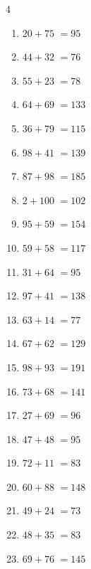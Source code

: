 \begin{multicols}{4}
\begin{enumerate}
  \item $20+75$
        $=95$

  \item $44+32$
        $=76$

  \item $55+23$
        $=78$

  \item $64+69$
        $=133$

  \item $36+79$
        $=115$

  \item $98+41$
        $=139$

  \item $87+98$
        $=185$

  \item $2+100$
        $=102$

  \item $95+59$
        $=154$

  \item $59+58$
        $=117$

  \item $31+64$
        $=95$

  \item $97+41$
        $=138$

  \item $63+14$
        $=77$

  \item $67+62$
        $=129$

  \item $98+93$
        $=191$

  \item $73+68$
        $=141$

  \item $27+69$
        $=96$

  \item $47+48$
        $=95$

  \item $72+11$
        $=83$

\columnbreak %

  \item $60+88$
        $=148$

  \item $49+24$
        $=73$

  \item $48+35$
        $=83$

  \item $69+76$
        $=145$


\end{enumerate}
\end{multicols}
